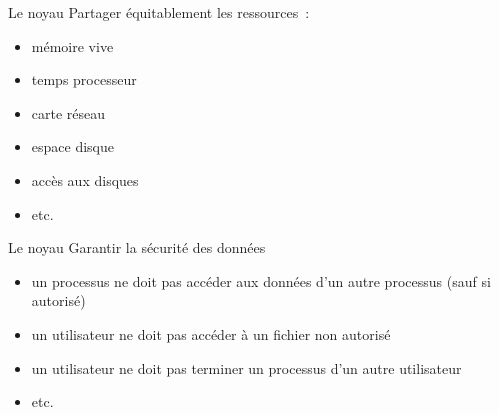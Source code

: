 \begin {frame} {Le noyau}
    Partager équitablement les ressources~:

    \begin {itemize}
	\item mémoire vive
	\item temps processeur
	\item carte réseau
	\item espace disque
	\item accès aux disques
	\item etc.
    \end {itemize}
\end {frame}

\begin {frame} {Le noyau}
    Garantir la sécurité des données

    \begin {itemize}
	\item un processus ne doit pas accéder aux données d'un autre
	    processus (sauf si autorisé)

	\item un utilisateur ne doit pas accéder à un fichier non autorisé

	\item un utilisateur ne doit pas terminer un processus d'un
	    autre utilisateur

	\item etc.

    \end {itemize}
\end {frame}

